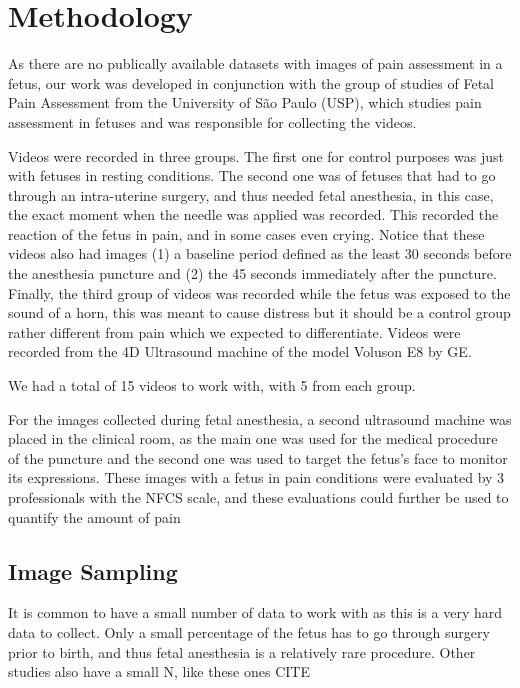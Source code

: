 \chapter{Methodology}

As there are no publically available datasets with images of pain assessment in a fetus, our work was developed in conjunction with the group of studies of Fetal Pain Assessment from the University of São Paulo (USP), which studies pain assessment in fetuses and was responsible for collecting the videos.

Videos were recorded in three groups. The first one for control purposes was just with fetuses in resting conditions. The second one was of fetuses that had to go through an intra-uterine surgery, and thus needed fetal anesthesia, in this case, the exact moment when the needle was applied was recorded. This recorded the reaction of the fetus in pain, and in some cases even crying. Notice that these videos also had images (1) a baseline period defined as the least 30 seconds before the anesthesia puncture and (2) the 45 seconds immediately after the puncture. Finally, the third group of videos was recorded while the fetus was exposed to the sound of a horn, this was meant to cause distress but it should be a control group rather different from pain which we expected to differentiate. Videos were recorded from the 4D Ultrasound machine of the model Voluson E8 by GE. 

We had a total of 15 videos to work with, with 5 from each group.

For the images collected during fetal anesthesia, a second ultrasound machine was placed in the clinical room, as the main one was used for the medical procedure of the puncture and the second one was used to target the fetus's face to monitor its expressions. These images with a fetus in pain conditions were evaluated by 3 professionals with the NFCS scale, and these evaluations could further be used to quantify the amount of pain 

\section{Image Sampling}

It is common to have a small number of data to work with as this is a very hard data to collect. Only a small percentage of the fetus has to go through surgery prior to birth, and thus fetal anesthesia is a relatively rare procedure. Other studies also have a small N, like these ones CITE

